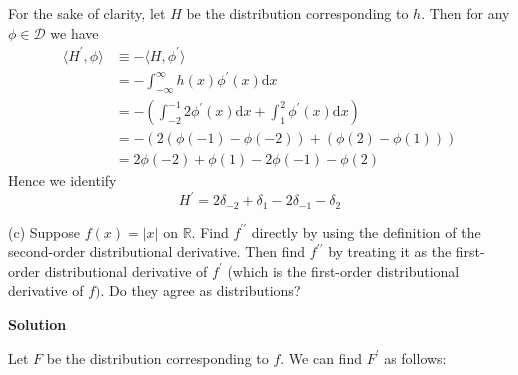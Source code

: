 \documentclass{article}
\begin{document}
For the sake of clarity, let $H$ be the distribution corresponding to
$h$. Then for any $\phi \in \mathcal{D}$ we have
%
\begin{align*}
    \langle H^\prime, \phi \rangle
        &\equiv - \langle H, \phi^\prime \rangle \\
        &= - \int_{- \infty}^{\infty} h(x) \phi^\prime(x) \mathrm{d} x \\
        &= - \left(
                \int_{-2}^{-1} 2 \phi^\prime(x) \mathrm{d} x
                + \int_{1}^{2} \phi^\prime(x) \mathrm{d} x
            \right) \\
        &= - \left(
                2 \left( \phi(-1) - \phi(-2) \right) + \left( \phi(2) - \phi(1) \right)
             \right) \\
        &= 2 \phi(-2) + \phi(1) - 2 \phi(-1) - \phi(2)
\end{align*}
%
Hence we identify
%
\begin{equation*}
    H^\prime = 2 \delta_{-2} + \delta_1 - 2 \delta_{-1} - \delta_2
\end{equation*}

\vspace{5mm}

(c) Suppose $f(x) = |x|$ on $\mathbb{R}$. Find $f^{\prime \prime}$
directly by using the definition of the second-order distributional
derivative. Then find $f^{\prime \prime}$ by treating it as the
first-order distributional derivative of $f^{\prime}$ (which is the
first-order distributional derivative of $f)$. Do they agree as
distributions?

\textbf{Solution}

Let $F$ be the distribution corresponding to $f$. We can find $F^\prime$
as follows:
\end{document}
